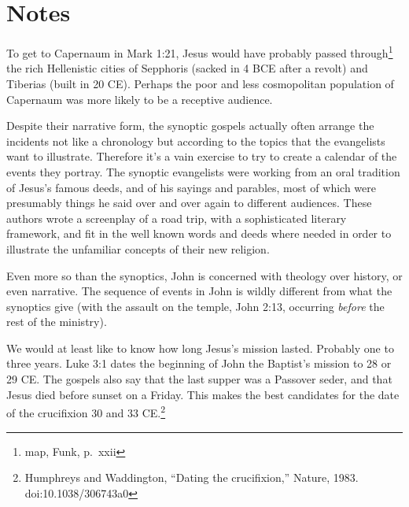 \documentclass[10pt,twoside]{article} %
\newcommand{\quotesize}{\normalsize{}}
\newcommand{\maintextquotesize}{\renewcommand{\quotesize}{\large{}}}
\newcommand{\notequotesize}{\renewcommand{\quotesize}{\normalsize{}}}
\newcommand{\intex}[1]{\index[texts]{#1}}
\newcommand{\reftex}[1]{#1\intex{#1}}
\newenvironment{notesection}[1]{
  \setcounter{secnumdepth}{0}          %
  \section*{#1}
  \setcounter{secnumdepth}{2}          %
  \notequotesize
}%
{
  \maintextquotesize
}
\begin{document}
\begin{notesection}{Notes}
To get to Capernaum in \reftex{Mark 1:21}, Jesus would have probably passed through\footnote{map, Funk, p.~xxii} the rich Hellenistic cities of
Sepphoris (sacked in 4 BCE after a revolt) and Tiberias (built in 20 CE). Perhaps the poor and less cosmopolitan
population of Capernaum was more likely to be a receptive audience.

Despite their narrative form,
the synoptic gospels actually often arrange the incidents not like a chronology but according to the topics that the evangelists want to illustrate.
Therefore it's a vain exercise to try to create a calendar of the events they portray. The synoptic evangelists were working
from an oral tradition of Jesus's famous deeds, and of his sayings and parables, most of which were presumably things he said over and over
again to different audiences. These authors wrote a screenplay of a road trip, with a sophisticated literary framework,
and fit in the well known words and deeds where needed in order to illustrate the unfamiliar concepts of their new
religion.

Even more so than the synoptics, John is concerned with
theology over history, or even narrative. The sequence of events in
John is wildly different from what the synoptics give (with the
assault on the temple, John 2:13, occurring \emph{before} the rest of
the ministry).

We would at least like to know how long Jesus's mission
lasted. Probably one to three years.  Luke 3:1 dates the beginning of
John the Baptist's mission to 28 or 29 CE.  The gospels also say that
the last supper was a Passover seder, and that Jesus died before
sunset on a Friday.  This makes the best candidates for the date of
the crucifixion 30 and 33 CE.\footnote{Humphreys and Waddington,
``Dating the crucifixion,'' Nature, 1983. doi:10.1038/306743a0 }


\end{notesection}
\end{document}
